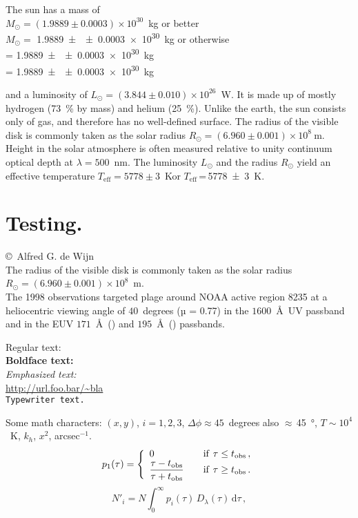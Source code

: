 The sun has a mass of\\
$M_\odot=(1.9889\pm0.0003)\times10^{30}$~kg or better\\
$M_\odot=$ \SI[multi-part-units = brackets]{1.9889\pm\pm0.0003e30}{\kilogram} or otherwise\\
\si{\MSun} = \SI[multi-part-units = brackets]{1.9889\pm\pm0.0003e30}{\kilogram}\\
\si{\MSun} = \SI[separate-uncertainty = false]{1.9889\pm\pm0.0003e30}{\kilogram}

and a luminosity of $L_\odot=(3.844\pm0.010)\times10^{26}$~W\@.
It is made up of mostly hydrogen (\SI{73}{\percent} by mass) and helium (\SI{25}{\percent}).
Unlike the earth, the sun consists only of gas, and therefore has no well-defined surface.
The radius of the visible disk is commonly taken as the solar radius $R_\odot=(6.960\pm0.001)\times10^8~\mathrm{m}$.
Height in the solar atmosphere is often measured relative to unity continuum optical depth at $\lambda=500$~nm.
The luminosity $L_\odot$ and the radius $R_\odot$ yield an effective temperature $T_\mathrm{eff}=5778\pm3$~K\@ or $T_\mathrm{eff}$\,=\,\SI{5778\pm3}{\kelvin}\@.

\section[Testing]{Testing. \hyperlink{toc}{\hyperback}}

\copyright~Alfred G. de Wijn\\
The radius of the visible disk is commonly taken as the solar radius $R_\odot=(6.960\pm0.001)\times10^8$~m.\\
The 1998 observations targeted plage around NOAA active region 8235 at a heliocentric viewing angle of $40$~degrees (µ = 0.77) in the $1600$~\AA\ UV passband and in the EUV $171$~\AA\ () and $195$~\AA\ () passbands.

Regular text: \ \\
\textbf{Boldface text: \ }\\
\emph{Emphasized text: \ }\\
\url{http://url.foo.bar/~bla}\\
\texttt{Typewriter text.}

Some math characters: $(x,y)$, $i=1,2,3$, $\Delta\phi\approx45$~degrees also $\approx$\,\SI{45}{\degree}, $T\sim10^4$~K, $k_h$, $x^2$, arcsec$^{-1}$.
\begin{equation}
	p_1(\tau)=\left\{\begin{array}{ll}
		\displaystyle0&\kern1em \mathrm{if}~\tau\le t_\mathrm{obs}\,,\\
		\displaystyle\frac{\tau-t_\mathrm{obs}}{\tau+t_\mathrm{obs}}&
			\kern1em \mathrm{if}~\tau\ge t_\mathrm{obs}\,.
		\end{array}\right.
\end{equation}
\begin{equation}
	N'_i=
		N\int_0^\infty\!\!p_i(\tau)\,
		D_\lambda(\tau)\,\mathrm{d}\tau\,,
\end{equation}


